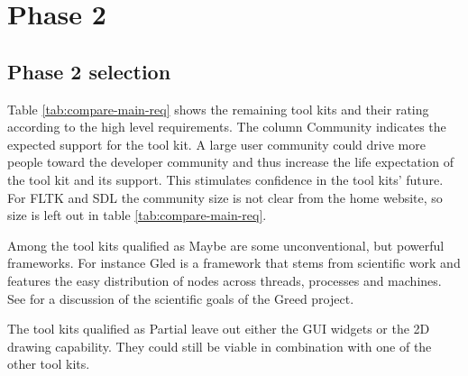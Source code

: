 \section{Phase 2}

\subsection{Phase 2 selection}

Table \ref{tab:compare-main-req} shows the remaining tool kits and their rating
according to the high level requirements. The column {\sc Community} indicates
the expected support for the tool kit. A large user community could drive more
people toward the developer community and thus increase the life expectation of
the tool kit and its support.  This stimulates confidence in the tool kits'
future.  For {\sf FLTK} and {\sf SDL} the community size is not clear from the
home website, so size is left out in table \ref{tab:compare-main-req}.

Among the tool kits qualified as {\sf\sc Maybe} are some unconventional, but
powerful frameworks. For instance {\sc Gled} is a framework that stems from
scientific work and features the easy distribution of nodes across threads,
processes and machines. See \cite{greed:gled} for a discussion of the
scientific goals of the {\sc\sf Greed} project.

The tool kits qualified as {\sf\sc Partial} leave out either the GUI widgets or
the 2D drawing capability. They could still be viable in combination with one
of the other tool kits.

